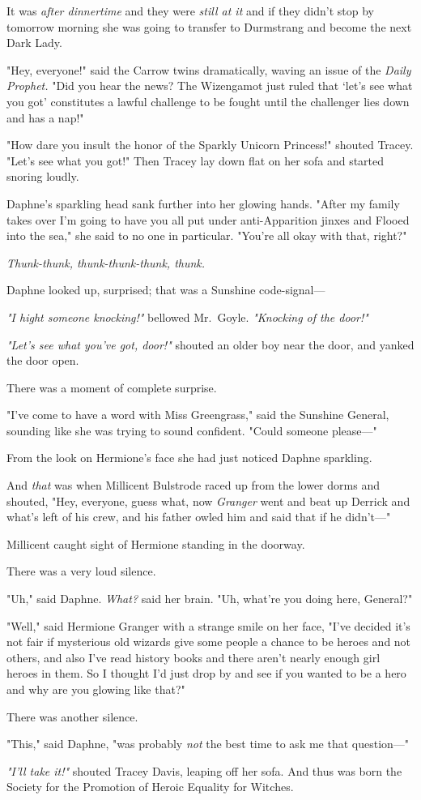 It was \emph{after dinnertime} and they were \emph{still at it} and if they
didn't stop by tomorrow morning she was going to transfer to Durmstrang and
become the next Dark Lady.

"Hey, everyone!" said the Carrow twins dramatically, waving an issue of the
\emph{Daily Prophet.} "Did you hear the news? The Wizengamot just ruled that
`let's see what you got' constitutes a lawful challenge to be fought until the
challenger lies down and has a nap!"

"How dare you insult the honor of the Sparkly Unicorn Princess!" shouted
Tracey. "Let's see what you got!" Then Tracey lay down flat on her sofa and
started snoring loudly.

Daphne's sparkling head sank further into her glowing hands. "After my family
takes over I'm going to have you all put under anti-Apparition jinxes and
Flooed into the sea," she said to no one in particular. "You're all okay with
that, right?"

\emph{Thunk-thunk, thunk-thunk-thunk, thunk.}

Daphne looked up, surprised; that was a Sunshine code-signal\mbox{---}

\emph{"I hight someone knocking!"} bellowed Mr.~Goyle. \emph{"Knocking of the
door!"}

\emph{"Let's see what you've got, door!"} shouted an older boy near the door,
and yanked the door open.

There was a moment of complete surprise.

"I've come to have a word with Miss Greengrass," said the Sunshine General,
sounding like she was trying to sound confident. "Could someone please\mbox{---}"

From the look on Hermione's face she had just noticed Daphne sparkling.

And \emph{that} was when Millicent Bulstrode raced up from the lower dorms and
shouted, "Hey, everyone, guess what, now \emph{Granger} went and beat up
Derrick and what's left of his crew, and his father owled him and said that if
he didn't\mbox{---}"

Millicent caught sight of Hermione standing in the doorway.

There was a very loud silence.

"Uh," said Daphne. \emph{What?} said her brain. "Uh, what're you doing here,
General?"

"Well," said Hermione Granger with a strange smile on her face, "I've decided
it's not fair if mysterious old wizards give some people a chance to be heroes
and not others, and also I've read history books and there aren't nearly enough
girl heroes in them. So I thought I'd just drop by and see if you wanted to be
a hero and why are you glowing like that?"

There was another silence.

"This," said Daphne, "was probably \emph{not} the best time to ask me that
question\mbox{---}"

\emph{"I'll take it!"} shouted Tracey Davis, leaping off her sofa.
\sbreak
And thus was born the Society for the Promotion of Heroic Equality for Witches.
